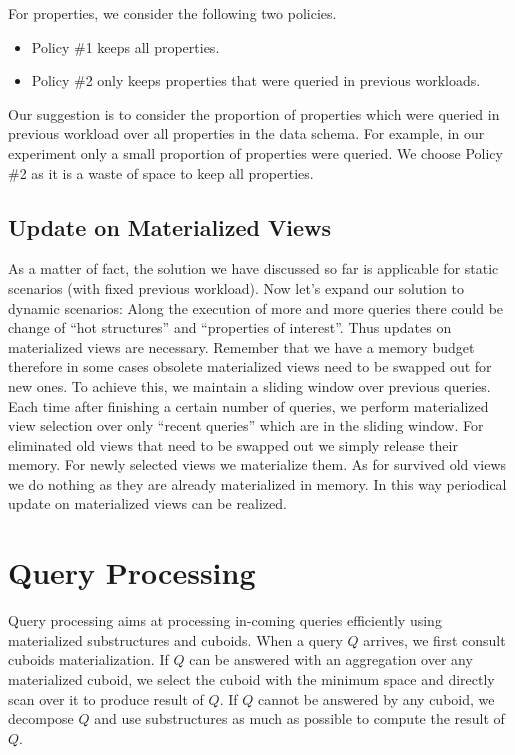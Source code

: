 For properties, we consider the following two policies.

\begin{itemize}
\item Policy \#1 keeps all properties.
\item Policy \#2 only keeps properties that were queried in previous workloads.
\end{itemize}

Our suggestion is to consider the proportion of properties which were queried in previous workload over all properties in the data schema. For example, in our experiment only a small proportion of properties were queried. We choose Policy \#2 as it is a waste of space to keep all properties.


\subsection{Update on Materialized Views}
As a matter of fact, the solution we have discussed so far is applicable for static scenarios (with fixed previous workload). Now let's expand our solution to dynamic scenarios: Along the execution of more and more queries there could be change of ``hot structures'' and ``properties of interest''. Thus updates on materialized views are necessary. Remember that we have a memory budget therefore in some cases obsolete materialized views need to be swapped out for new ones. To achieve this, we maintain a sliding window over previous queries. Each time after finishing a certain number of queries, we perform materialized view selection over only ``recent queries'' which are in the sliding window. For eliminated old views that need to be swapped out we simply release their memory. For newly selected views we materialize them. As for survived old views we do nothing as they are already materialized in memory. In this way periodical update on materialized views can be realized.


\section{Query Processing}
\label{Future Query Processing Part}
Query processing aims at processing in-coming queries efficiently using materialized substructures and cuboids. When a query $Q$ arrives, we first consult cuboids materialization. If $Q$ can be answered with an aggregation over any materialized cuboid, we select the cuboid with the minimum space and directly scan over it to produce result of $Q$. If $Q$ cannot be answered by any cuboid, we decompose $Q$ and use substructures as much as possible to compute the result of $Q$.

